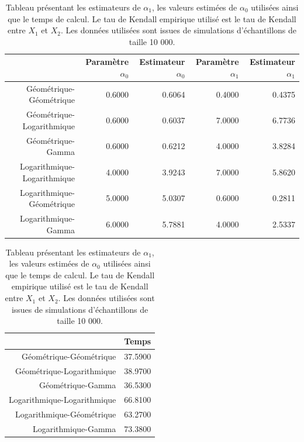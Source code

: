 \documentclass{article}
\begin{document}
	\begin{table}[H]
		\centering
		\begin{tabular}{rrrrr}
			\hline
			& Paramètre $\alpha_{0}$ & Estimateur $\alpha_{0}$ & Paramètre $\alpha_{1}$ & Estimateur $\alpha_{1}$  \\ 
			\hline
			Géométrique-Géométrique & 0.6000 & 0.6064 & 0.4000 & 0.4375  \\ 
			Géométrique-Logarithmique & 0.6000 & 0.6037 & 7.0000 & 6.7736 \\ 
			Géométrique-Gamma & 0.6000 & 0.6212 & 4.0000 & 3.8284 \\ 
			Logarithmique-Logarithmique & 4.0000 & 3.9243 & 7.0000 & 5.8620  \\ 
			Logarithmique-Géométrique & 5.0000 & 5.0307 & 0.6000 & 0.2811 \\ 
			Logarithmique-Gamma & 6.0000 & 5.7881 & 4.0000 & 2.5337  \\  
			\hline
		\end{tabular}
		\begin{tabular}{rr}
			\hline
			& Temps \\ 
			\hline
			Géométrique-Géométrique & 37.5900 \\ 
			Géométrique-Logarithmique  & 38.9700 \\ 
			Géométrique-Gamma & 36.5300 \\ 
			Logarithmique-Logarithmique & 66.8100 \\ 
			Logarithmique-Géométrique  & 63.2700 \\ 
			Logarithmique-Gamma  & 73.3800 \\  
			\hline
		\end{tabular}
		\caption{Tableau présentant les estimateurs de $\alpha_{1}$, les valeurs estimées de $\alpha_{0}$ utilisées ainsi que le temps de calcul. Le tau de Kendall empirique utilisé est le tau de Kendall entre $X_{1}$ et $X_{2}$. Les données utilisées sont issues de simulations d’échantillons de taille 10 000.}
		\label{resultats_alpha1}
	\end{table}
	
\end{document}
